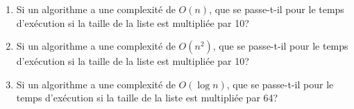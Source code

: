 \documentclass[11pt, a4paper]{report}
\begin{document}
\def\level{Premiere}  %
\def\course{NSI}
\def\chaptername{Les algorithmes de recherche} %
\def\docname{AP06~--~TD 1}        %

\pagestyle{DS_LP}

\NomPrenom{}

\begin{exercice_cours}{}
    
    \begin{enumerate}
        \item Si un algorithme a une complexité de $O(n)$, que se passe-t-il pour le temps d'exécution si la taille de la liste est multipliée par 10? \hfill
        \item Si un algorithme a une complexité de $O(n^2)$, que se passe-t-il pour le temps d'exécution si la taille de la liste est multipliée par 10? \hfill
        \item Si un algorithme a une complexité de $O(\log n)$, que se passe-t-il pour le temps d'exécution si la taille de la liste est multipliée par 64? \hfill
    \end{enumerate}   
\end{exercice_cours}
\end{document}
